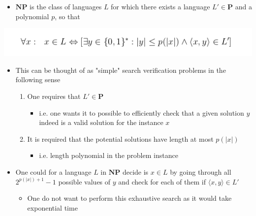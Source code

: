 \documentclass[11pt]{article}
\begin{document}
\begin{itemize}
\item \(\mathbf{NP}\) is the class of languages \(L\) for which there exists a language \(L' \in \mathbf P\) and a polynomial \(p\), so that
\end{itemize}
\begin{center}
\includegraphics[width=.9\linewidth]{P, NP and NPC/screenshot_2019-03-22_10-56-37.png}
\end{center}
\begin{itemize}
\item This can be thought of as "simple" search verification problems in the following sense
\begin{enumerate}
\item One requires that \(L' \in \mathbf P\)
\begin{itemize}
\item i.e. one wants it to possible to efficiently check that a given solution \(y\) indeed is a valid solution for the instance \(x\)
\end{itemize}
\item It is required that the potential solutions have length at most \(p(|x|)\)
\begin{itemize}
\item i.e. length polynomial in the problem instance
\end{itemize}
\end{enumerate}

\item One could for a language \(L\) in \(\mathbf{NP}\) decide is \(x \in L\) by going through all \(2^{p(|x|)+1}-1\) possible values of \(y\) and check for each of them if \(\langle x, y \rangle \in L'\)
\begin{itemize}
\item One do not want to perform this exhaustive search as it would take exponential time
\end{itemize}


\end{itemize}
\end{document}
